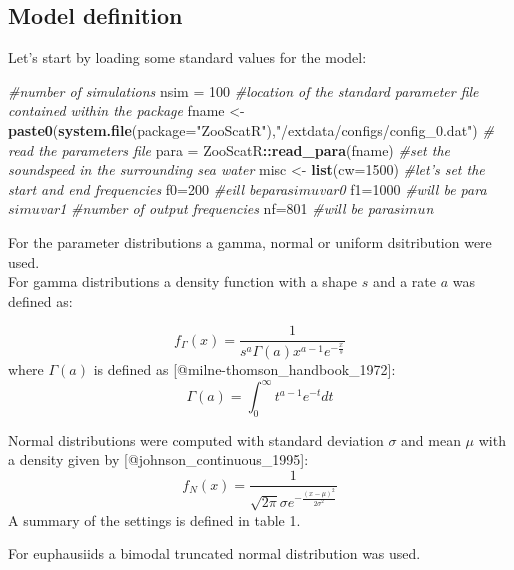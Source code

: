 \documentclass[
]{article}
\newenvironment{Shaded}{\begin{snugshade}}{\end{snugshade}}
\newcommand{\CommentTok}[1]{\textcolor[rgb]{0.56,0.35,0.01}{\textit{#1}}}
\newcommand{\DataTypeTok}[1]{\textcolor[rgb]{0.13,0.29,0.53}{#1}}
\newcommand{\DecValTok}[1]{\textcolor[rgb]{0.00,0.00,0.81}{#1}}
\newcommand{\KeywordTok}[1]{\textcolor[rgb]{0.13,0.29,0.53}{\textbf{#1}}}
\newcommand{\NormalTok}[1]{#1}
\newcommand{\OperatorTok}[1]{\textcolor[rgb]{0.81,0.36,0.00}{\textbf{#1}}}
\newcommand{\StringTok}[1]{\textcolor[rgb]{0.31,0.60,0.02}{#1}}
\begin{document}
\hypertarget{model-definition}{%
\subsection{Model definition}\label{model-definition}}

Let's start by loading some standard values for the model:

\begin{Shaded}
\begin{Highlighting}[]
\CommentTok{#number of simulations}
\NormalTok{nsim =}\StringTok{ }\DecValTok{100}
\CommentTok{#location of the standard parameter file contained within the package}
\NormalTok{fname <-}\StringTok{ }\KeywordTok{paste0}\NormalTok{(}\KeywordTok{system.file}\NormalTok{(}\DataTypeTok{package=}\StringTok{"ZooScatR"}\NormalTok{),}\StringTok{"/extdata/configs/config_0.dat"}\NormalTok{)}
\CommentTok{# read the parameters file}
\NormalTok{para =}\StringTok{ }\NormalTok{ZooScatR}\OperatorTok{::}\KeywordTok{read_para}\NormalTok{(fname)}
\CommentTok{#set the soundspeed in the surrounding sea water}
\NormalTok{misc <-}\StringTok{ }\KeywordTok{list}\NormalTok{(}\DataTypeTok{cw=}\DecValTok{1500}\NormalTok{)}
\CommentTok{#let's set the start and end frequencies}
\NormalTok{f0=}\DecValTok{200} \CommentTok{#eill bepara$simu$var0}
\NormalTok{f1=}\DecValTok{1000} \CommentTok{#will be para$simu$var1}
\CommentTok{#number of output frequencies}
\NormalTok{nf=}\DecValTok{801} \CommentTok{#will be para$simu$n}
\end{Highlighting}
\end{Shaded}

For the parameter distributions a gamma, normal or uniform dsitribution
were used.\\
For gamma distributions a density function with a shape \(s\) and a rate
\(a\) was defined as:

\[f_{\Gamma}(x)= \frac{1}{s^a \Gamma(a) x^{a-1} e^{-\frac{x}{s}}}\]
where \(\Gamma(a)\) is defined as
{[}@milne-thomson\_handbook\_1972{]}:\\
\[\Gamma(a)=\int_0^\infty{t^{a-1}e^{-t} dt}\]

Normal distributions were computed with standard deviation \(\sigma\)
and mean \(\mu\) with a density given by
{[}@johnson\_continuous\_1995{]}:
\[f_N(x)=\frac{1}{\sqrt{2\pi}\sigma e^{-{\frac{(x-\mu)^2}{2\sigma^2}}}}\]
A summary of the settings is defined in table 1.

For euphausiids a bimodal truncated normal distribution was used.
\end{document}
